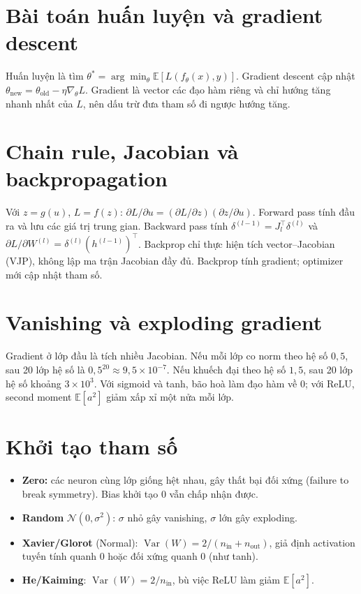 \documentclass[12pt,a4paper]{report}
\begin{document}
\section{Bài toán huấn luyện và gradient descent}
Huấn luyện là tìm $\theta^\ast=\arg\min_\theta \mathbb E[L(f_\theta(x),y)]$. Gradient descent cập nhật $\theta_{\text{new}}=\theta_{\text{old}}-\eta\nabla_\theta L$. Gradient là vector các đạo hàm riêng và chỉ hướng tăng nhanh nhất của $L$, nên dấu trừ đưa tham số đi ngược hướng tăng.

\section{Chain rule, Jacobian và backpropagation}
Với $z=g(u)$, $L=f(z)$: $\partial L/\partial u=(\partial L/\partial z)(\partial z/\partial u)$. Forward pass tính đầu ra và lưu các giá trị trung gian. Backward pass tính $\delta^{(l-1)}=J_l^\top\delta^{(l)}$ và $\partial L/\partial W^{(l)}=\delta^{(l)}(h^{(l-1)})^\top$. Backprop chỉ thực hiện tích vector--Jacobian (VJP), không lập ma trận Jacobian đầy đủ. Backprop tính gradient; optimizer mới cập nhật tham số.

\section{Vanishing và exploding gradient}
Gradient ở lớp đầu là tích nhiều Jacobian. Nếu mỗi lớp co norm theo hệ số $0{,}5$, sau 20 lớp hệ số là $0{,}5^{20}\approx9{,}5\times10^{-7}$. Nếu khuếch đại theo hệ số $1{,}5$, sau 20 lớp hệ số khoảng $3\times10^{3}$. Với sigmoid và tanh, bão hoà làm đạo hàm về 0; với ReLU, second moment $\mathbb E[a^2]$ giảm xấp xỉ một nửa mỗi lớp.

\section{Khởi tạo tham số}
\begin{itemize}
  \item \textbf{Zero:} các neuron cùng lớp giống hệt nhau, gây thất bại đối xứng (failure to break symmetry). Bias khởi tạo 0 vẫn chấp nhận được.
  \item \textbf{Random} $\mathcal N(0,\sigma^2)$: $\sigma$ nhỏ gây vanishing, $\sigma$ lớn gây exploding.
  \item \textbf{Xavier/Glorot} (Normal): $\operatorname{Var}(W)=2/(n_{\text{in}}+n_{\text{out}})$, giả định activation tuyến tính quanh 0 hoặc đối xứng quanh 0 (như tanh).
  \item \textbf{He/Kaiming}: $\operatorname{Var}(W)=2/n_{\text{in}}$, bù việc ReLU làm giảm $\mathbb E[a^2]$.
\end{itemize}
\end{document}
